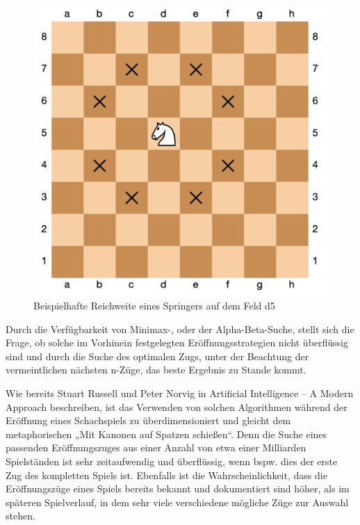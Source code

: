 \begin{figure}[h]
\centering
\includegraphics[width=\textwidth/2]{images/opening-books-strong-center-example.png}

\caption{Beispielhafte Reichweite eines Springers auf dem Feld d5}\label{fig:knight_reach}
\end{figure}

Durch die Verfügbarkeit von Minimax-, oder der Alpha-Beta-Suche, stellt sich die Frage, ob solche im Vorhinein festgelegten Eröffnungsstrategien nicht überflüssig sind und durch die Suche des optimalen Zugs, unter der Beachtung der vermeintlichen nächsten n-Züge, das beste Ergebnis zu Stande kommt.

Wie bereits Stuart Russell und Peter Norvig in Artificial Intelligence – A Modern Approach beschreiben, ist das Verwenden von solchen Algorithmen während der Eröffnung eines Schachspiels zu überdimensioniert und gleicht dem metaphorischen „Mit Kanonen auf Spatzen schießen“. Denn die Suche eines passenden Eröffnungszuges aus einer Anzahl von etwa einer Milliarden Spielständen ist sehr zeitaufwendig und überflüssig, wenn bspw. dies der erste Zug des kompletten Spiels ist.\cite{Russell2010} Ebenfalls ist die Wahrscheinlichkeit, dass die Eröffnungszüge eines Spiels bereits bekannt und dokumentiert sind höher, als im späteren Spielverlauf, in dem sehr viele verschiedene mögliche Züge zur Auswahl stehen.

